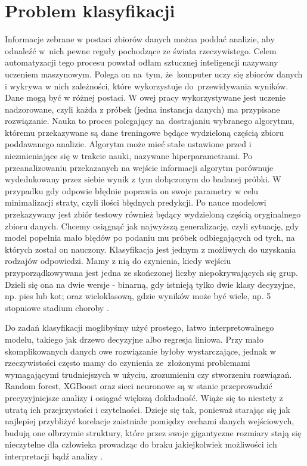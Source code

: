 \section{Problem klasyfikacji}
Informacje zebrane w postaci zbiorów danych można poddać analizie, aby odnaleźć w~nich pewne reguły pochodzące ze świata rzeczywistego. Celem automatyzacji tego procesu powstał odłam sztucznej inteligencji nazywany uczeniem maszynowym. Polega on na~tym, że~komputer uczy się zbiorów danych i wykrywa w nich zależności, które wykorzystuje do~przewidywania wyników. Dane mogą być w różnej postaci. W owej pracy wykorzystywane jest uczenie nadzorowane, czyli każda z próbek (jedna instancja danych) ma przypisane rozwiązanie. Nauka to proces polegający na~dostrajaniu wybranego algorytmu, któremu przekazywane są dane treningowe będące wydzieloną częścią zbioru poddawanego analizie. Algorytm może mieć stałe ustawione przed i niezmieniające się w trakcie nauki, nazywane hiperparametrami. Po przeanalizowaniu przekazanych na wejście informacji algorytm porównuje wydedukowany przez siebie wynik z tym dołączonym do badanej próbki. W przypadku gdy odpowie błędnie poprawia on swoje parametry w celu minimalizacji straty, czyli ilości błędnych predykcji. Po nauce modelowi przekazywany jest zbiór testowy również będący wydzieloną częścią oryginalnego zbioru danych. Chcemy osiągnąć jak najwyższą generalizację, czyli sytuację, gdy model popełnia mało błędów po podaniu mu próbek odbiegających od tych, na których został on nauczony. Klasyfikacja jest jednym z możliwych do uzyskania rodzajów odpowiedzi. Mamy z nią do czynienia, kiedy wejściu przyporządkowywana jest jedna ze skończonej liczby niepokrywających się grup. Dzieli się ona na dwie wersje - binarną, gdy istnieją tylko dwie klasy decyzyjne, np. pies lub kot; oraz wieloklasową, gdzie wyników może być wiele, np. 5 stopniowe stadium choroby \cite{bishop2006pattern, classification_gov, classification_google}. 

Do zadań klasyfikacji moglibyśmy użyć prostego, łatwo interpretowalnego modelu, takiego jak drzewo decyzyjne albo regresja liniowa. Przy mało skomplikowanych danych owe rozwiązanie byłoby wystarczające, jednak w rzeczywistości często mamy do czynienia ze~złożonymi problemami wymagającymi trudniejszych w użyciu, zrozumieniu czy stworzeniu rozwiązań. Random forest, XGBoost oraz sieci neuronowe są w stanie przeprowadzić precyzyjniejsze analizy i osiągać większą dokładność. Wiąże się to niestety z utratą ich przejrzystości i czytelności. Dzieje się tak, ponieważ starając się jak najlepiej przybliżyć korelacje zaistniałe pomiędzy cechami danych wejściowych, budują one olbrzymie struktury, które przez swoje gigantyczne rozmiary stają się nieczytelne dla człowieka prowadząc do braku jakiejkolwiek możliwości ich interpretacji bądź analizy \cite{ALI2023101805}. 

